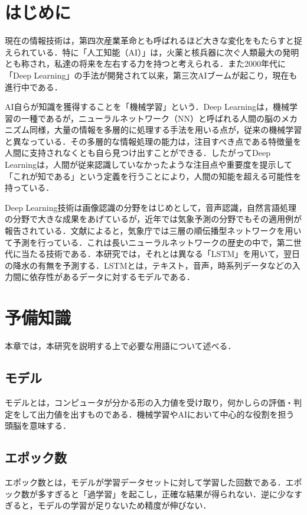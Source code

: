 \documentclass[a4j, 9pt, twocolumn, twoside]{jsarticle}
\newcommand{\Teacher}{西村 治}
\begin{document}
\twocolumn[\Maketitle]\footnotetext[1]{指導教員: \Teacher}
\section{はじめに}
	現在の情報技術は，第四次産業革命とも呼ばれるほど大きな変化をもたらすと捉えられている．特に「人工知能（AI）」は，火薬と核兵器に次ぐ人類最大の発明とも称され，私達の将来を左右する力を持つと考えられる．また2000年代に「Deep Learning」の手法が開発されて以来，第三次AIブームが起こり，現在も進行中である．

	AI自らが知識を獲得することを「機械学習」という．Deep Learningは，機械学習の一種であるが，ニューラルネットワーク（NN）と呼ばれる人間の脳のメカニズム同様，大量の情報を多層的に処理する手法を用いる点が，従来の機械学習と異なっている．その多層的な情報処理の能力は，注目すべき点である特徴量を人間に支持されなくとも自ら見つけ出すことができる．したがってDeep Learningは，人間が従来認識していなかったような注目点や重要度を提示して「これが知である」という定義を行うことにより，人間の知能を超える可能性を持っている．\cite{rinri}

	Deep Learning技術は画像認識の分野をはじめとして，音声認識，自然言語処理の分野で大きな成果をあげているが，近年では気象予測の分野でもその適用例が報告されている．文献\Cite{kishow}によると，気象庁では三層の順伝播型ネットワークを用いて予測を行っている．これは長いニューラルネットワークの歴史の中で，第二世代に当たる技術である．本研究では，それとは異なる「LSTM」を用いて，翌日の降水の有無を予測する．LSTMとは，テキスト，音声，時系列データなどの入力間に依存性があるデータに対するモデルである．

\section{予備知識}
	本章では，本研究を説明する上で必要な用語について述べる．
	\subsection{モデル}
		モデルとは，コンピュータが分かる形の入力値を受け取り，何かしらの評価・判定をして出力値を出すものである．機械学習やAIにおいて中心的な役割を担う頭脳を意味する．
	\subsection{エポック数}
		エポック数とは，モデルが学習データセットに対して学習した回数である．エポック数が多すぎると「過学習」を起こし，正確な結果が得られない．逆に少なすぎると，モデルの学習が足りないため精度が伸びない．
\end{document}
